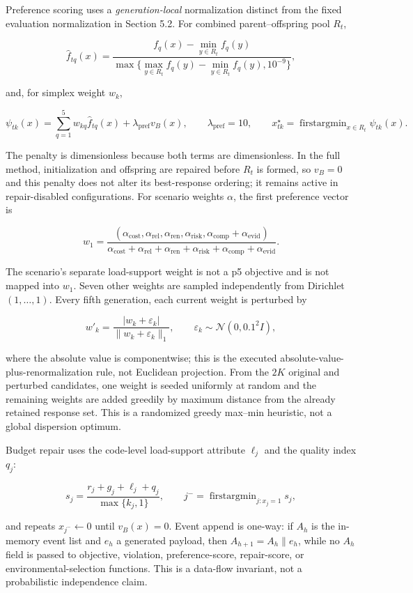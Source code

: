 \documentclass[
  10pt,
  a4paper,
]{article}
\begin{document}
Preference scoring uses a \emph{generation-local} normalization distinct
from the fixed evaluation normalization in Section 5.2. For combined
parent--offspring pool \(R_t\),

\[
\hat f_{tq}(x)=
\frac{f_q(x)-\min_{y\in R_t}f_q(y)}
{\max\{\max_{y\in R_t}f_q(y)-\min_{y\in R_t}f_q(y),10^{-9}\}},
\]

and, for simplex weight \(w_k\),

\[
\psi_{tk}(x)=\sum_{q=1}^{5}w_{kq}\hat f_{tq}(x)
+\lambda_{\mathrm{pref}}v_B(x),\qquad
\lambda_{\mathrm{pref}}=10,
\qquad x_{tk}^\star=\operatorname{firstargmin}_{x\in R_t}\psi_{tk}(x).
\]

The penalty is dimensionless because both terms are dimensionless. In
the full method, initialization and offspring are repaired before
\(R_t\) is formed, so \(v_B=0\) and this penalty does not alter its
best-response ordering; it remains active in repair-disabled
configurations. For scenario weights \(\alpha\), the first preference
vector is

\[
w_1=\frac{(\alpha_{\mathrm{cost}},\alpha_{\mathrm{rel}},
\alpha_{\mathrm{ren}},\alpha_{\mathrm{risk}},
\alpha_{\mathrm{comp}}+\alpha_{\mathrm{evid}})}
{\alpha_{\mathrm{cost}}+\alpha_{\mathrm{rel}}+\alpha_{\mathrm{ren}}+
\alpha_{\mathrm{risk}}+\alpha_{\mathrm{comp}}+\alpha_{\mathrm{evid}}}.
\]

The scenario's separate load-support weight is not a p5 objective and is
not mapped into \(w_1\). Seven other weights are sampled independently
from Dirichlet\((1,\ldots,1)\). Every fifth generation, each current
weight is perturbed by

\[
w'_k=\frac{|w_k+\varepsilon_k|}{\|w_k+\varepsilon_k\|_1},\qquad
\varepsilon_k\sim\mathcal N(0,0.1^2I),
\]

where the absolute value is componentwise; this is the executed
absolute-value-plus-renormalization rule, not Euclidean projection. From
the \(2K\) original and perturbed candidates, one weight is seeded
uniformly at random and the remaining weights are added greedily by
maximum distance from the already retained response set. This is a
randomized greedy max--min heuristic, not a global dispersion optimum.

Budget repair uses the code-level load-support attribute \(\ell_j\) and
the quality index \(q_j\):

\[
s_j=\frac{r_j+g_j+\ell_j+q_j}{\max\{k_j,1\}},
\qquad
j^-=\operatorname{firstargmin}_{j:x_j=1}s_j,
\]

and repeats \(x_{j^-}\leftarrow0\) until \(v_B(x)=0\). Event append is
one-way: if \(A_h\) is the in-memory event list and \(e_h\) a generated
payload, then \(A_{h+1}=A_h\mathbin{\|}e_h\), while no \(A_h\) field is
passed to objective, violation, preference-score, repair-score, or
environmental-selection functions. This is a data-flow invariant, not a
probabilistic independence claim.
\end{document}
